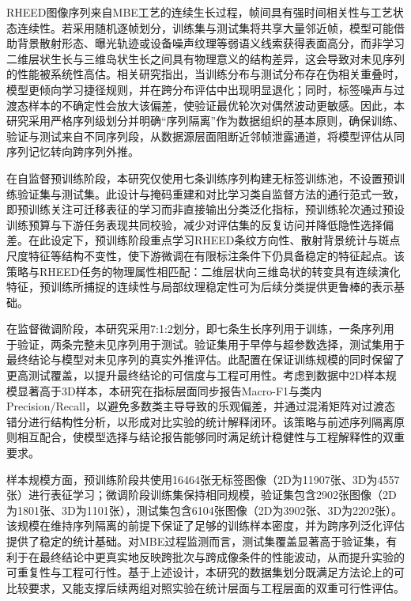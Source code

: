 RHEED图像序列来自MBE工艺的连续生长过程，帧间具有强时间相关性与工艺状态连续性。若采用随机逐帧划分，训练集与测试集将共享大量邻近帧，模型可能借助背景散射形态、曝光轨迹或设备噪声纹理等弱语义线索获得表面高分，而非学习二维层状生长与三维岛状生长之间具有物理意义的结构差异，这会导致对未见序列的性能被系统性高估。相关研究指出，当训练分布与测试分布存在伪相关重叠时，模型更倾向学习捷径规则，并在跨分布评估中出现明显退化；同时，标签噪声与过渡态样本的不确定性会放大该偏差，使验证最优轮次对偶然波动更敏感。因此，本研究采用严格序列级划分并明确“序列隔离”作为数据组织的基本原则，确保训练、验证与测试来自不同序列段，从数据源层面阻断近邻帧泄露通道，将模型评估从同序列记忆转向跨序列外推。

在自监督预训练阶段，本研究仅使用七条训练序列构建无标签训练池，不设置预训练验证集与测试集。此设计与掩码重建和对比学习类自监督方法的通行范式一致，即预训练关注可迁移表征的学习而非直接输出分类泛化指标，预训练轮次通过预设训练预算与下游任务表现共同校验，减少对评估集的反复访问并降低隐性选择偏差。在此设定下，预训练阶段重点学习RHEED条纹方向性、散射背景统计与斑点尺度特征等结构不变性，使下游微调在有限标注条件下仍具备稳定的特征起点。该策略与RHEED任务的物理属性相匹配：二维层状向三维岛状的转变具有连续演化特征，预训练所捕捉的连续性与局部纹理稳定性可为后续分类提供更鲁棒的表示基础。

在监督微调阶段，本研究采用7:1:2划分，即七条生长序列用于训练，一条序列用于验证，两条完整未见序列用于测试。验证集用于早停与超参数选择，测试集用于最终结论与模型对未见序列的真实外推评估。此配置在保证训练规模的同时保留了更高测试覆盖，以提升最终结论的可信度与工程可用性。考虑到数据中2D样本规模显著高于3D样本，本研究在指标层面同步报告Macro-F1与类内Precision/Recall，以避免多数类主导导致的乐观偏差，并通过混淆矩阵对过渡态错分进行结构性分析，以形成对比实验的统计解释闭环。该策略与前述序列隔离原则相互配合，使模型选择与结论报告能够同时满足统计稳健性与工程解释性的双重要求。

样本规模方面，预训练阶段共使用16464张无标签图像（2D为11907张、3D为4557张）进行表征学习；微调阶段训练集保持相同规模，验证集包含2902张图像（2D为1801张、3D为1101张），测试集包含6104张图像（2D为3902张、3D为2202张）。该规模在维持序列隔离的前提下保证了足够的训练样本密度，并为跨序列泛化评估提供了稳定的统计基础。对MBE过程监测而言，测试集覆盖显著高于验证集，有利于在最终结论中更真实地反映跨批次与跨成像条件的性能波动，从而提升实验的可重复性与工程可行性。基于上述设计，本研究的数据集划分既满足方法论上的可比较要求，又能支撑后续两组对照实验在统计层面与工程层面的双重可行性评估。

